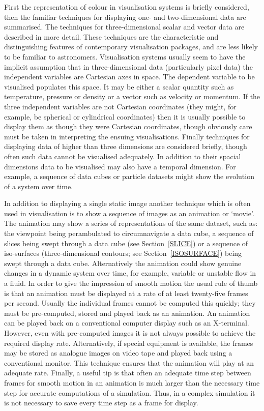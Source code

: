 \documentclass[twoside,11pt]{article}
\begin{document}
First the representation of colour in visualisation systems is briefly
considered, then  the familiar techniques for displaying one- and
two-dimensional data are summarised. The techniques for three-dimensional
scalar and vector data are described in more detail. These techniques are
the characteristic and distinguishing features of contemporary
visualisation packages, and are less likely to be familiar to
astronomers. Visualisation systems usually seem to have the implicit
assumption that in three-dimensional data (particularly pixel data)
the independent variables are Cartesian axes in space. The dependent
variable to be visualised populates this space. It may be either a
scalar quantity such as temperature, pressure or density or a vector
such as velocity or momentum. If the three independent variables are
not Cartesian coordinates  (they might, for example, be spherical or
cylindrical coordinates) then it is usually possible to display them as
though they were Cartesian coordinates, though obviously care must be
taken in interpreting the ensuing visualisations. Finally techniques for
displaying data of higher than three dimensions are considered briefly,
though often such data cannot be visualised adequately. In addition to
their spacial dimensions data to be visualised may also have a temporal
dimension. For example, a sequence of data cubes or particle datasets
might show the evolution of a system over time.

In addition to displaying a single static image another technique which
is often used in visualisation is to show a sequence of images as an
animation or `movie'. The animation may show a series of representations
of the same dataset, such as: the viewpoint being perambulated to
circumnavigate a data cube, a sequence of slices being swept through a
data cube (see Section~\ref{SLICE}) or a sequence of iso-surfaces
(three-dimensional contours; see Section~\ref{ISOSURFACE}) being swept
through a data cube. Alternatively the animation could show genuine
changes in a dynamic system over time, for example, variable or unstable
flow in a fluid. In order to give the impression of smooth motion
the usual rule of thumb is that an animation must be displayed
at a rate of at least twenty-five frames per second. Usually the
individual frames cannot be computed this quickly; they must be
pre-computed, stored and played back as an animation. An animation can
be played back on a conventional computer display such as an X-terminal.
However, even with pre-computed images it is not always possible to
achieve the required display rate. Alternatively, if special equipment
is available, the frames may be stored as analogue images on video tape
and played back using a conventional monitor. This technique ensures
that the animation will play at an adequate rate. Finally, a useful tip
is that often an adequate time step between frames for smooth motion in
an animation is much larger than the necessary time step for accurate
computations of a simulation. Thus, in a complex simulation it is not
necessary to save every time step as a frame for display.
\end{document}
